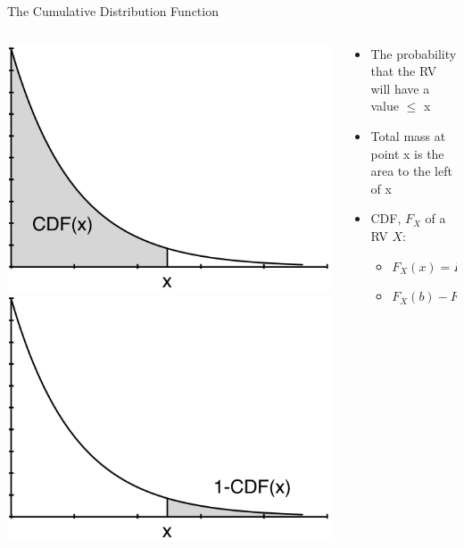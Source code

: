 \documentclass[aspectratio=169]{beamer}
\begin{document}
\begin{frame}{The Cumulative Distribution Function}

\begin{columns}[c]
\begin{column}{0.35\textwidth}
\includegraphics[width=1\textwidth]{lectModel1/expDistributionCDF.pdf}\\
\includegraphics[width=1\textwidth]{lectModel1/expDistribution1MinusCDF.pdf}
\end{column}
\begin{column}{0.65\textwidth}
\begin{itemize}
\item The probability that the RV will have a value $\le$ x
\item Total mass at point x is the area to the left of x
\item CDF, $F_X$ of a RV $X$:
\begin{itemize}
\item $F_X(x) = P( X\le x)$
\item $F_X(b) - F_X(a) = P( a < X \le b)$
\end{itemize}
\end{itemize}
\end{column}
\end{columns}
\end{frame}
\end{document}
